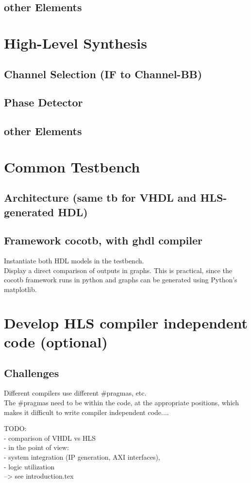   \subsection{other Elements}

\section{High-Level Synthesis}
  \subsection{Channel Selection (IF to Channel-BB)}
  \subsection{Phase Detector}
  \subsection{other Elements}

\section{Common Testbench}
  \subsection{Architecture (same tb for VHDL and HLS-generated HDL)}
  \subsection{Framework cocotb, with ghdl compiler}
  Instantiate both HDL models in the testbench.\\
  Display a direct comparison of outputs in graphs. This is practical, since the cocotb framework runs in python and graphs can be generated using Python's matplotlib.

\section{Develop HLS compiler independent code (optional)}
  \subsection{Challenges}
  Different compilers use different \#pragmas, etc.\\
  The \#pragmas need to be within the code, at the appropriate positions, which makes it difficult to write compiler independent code....

  TODO: \\
  - comparison of VHDL vs HLS\\
  - in the point of view:\\
  - system integration (IP generation, AXI interfaces),\\
  - logic utilization\\
--> see introduction.tex
